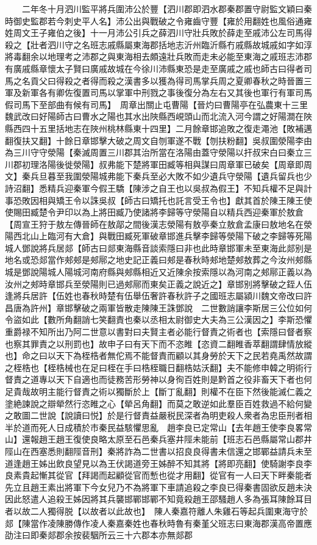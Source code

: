 　　二年冬十月泗川監平將兵圍沛公於豐【泗川郡即泗水郡秦郡置守尉監文穎曰秦時御史監郡若今刺史平人名】沛公出與戰破之令雍齒守豐【雍於用翻姓也風俗通雍姓周文王子雍伯之後】十一月沛公引兵之薛泗川守壯兵敗於薛走至戚沛公左司馬得殺之【壯者泗川守之名班志戚縣屬東海郡括地志沂州臨沂縣冇戚縣故城戚如字如淳將毒翻余以地理考之沛郡之與東海相去頗遠壯兵敗而走未必能至東海之戚班志沛郡有廣戚縣章懷太子賢曰廣戚故城在今徐川沛縣東恐是走至廣戚之戚也師古曰得者司馬之名貢父曰得殺之者得而殺之漢書多以獲為得司馬掌兵周之夏卿春秋之時晉置三軍及新軍各有卿佐復置司馬以掌軍中刑戮之事後復分為左右又其後也軍行有軍司馬假司馬下至部曲有候有司馬】　周章出關止屯曹陽【晉灼曰曹陽亭在弘農東十三里魏武改曰好陽師古曰曹水之陽也其水出陜縣西峴頭山而北流入河今謂之好陽澗在陜縣西四十五里括地志在陜州桃林縣東十四里】二月餘章邯追敗之復走澠池【敗補邁翻復扶又翻】十餘日章邯擊大破之周文自刎軍遂不戰【刎扶粉翻】吳叔圍滎陽李由為三川守守滎陽【秦滅周置三川郡其治所當在洛陽由蓋守滎陽以扞叔宋白曰秦立三川郡初理洛陽後徙滎陽】叔弗能下楚將軍田臧等相與謀曰周章軍已破矣【周章即周文】秦兵旦暮至我圍滎陽城弗能下秦兵至必大敗不如少遺兵守滎陽【遺兵留兵也少詩沼翻】悉精兵迎秦軍今假王驕【陳涉之自王也以吳叔為假王】不知兵權不足與計事恐敗因相與矯王令以誅吳叔【師古曰矯托也託言受王令也】獻其首於陳王陳王使使賜田臧楚令尹印以為上將田臧乃使諸將李歸等守滎陽自以精兵西迎秦軍於敖倉【周宣王狩于敖左傳晉師在敖鄗之間後漢志滎陽有敖亭秦立敖倉孟康曰敖地名在滎陽西北山上臨河有大倉】與戰田臧死軍破章邯進兵擊李歸等滎陽下破之李歸等死陽城人鄧說將兵居郯【師古曰郯東海縣音談索隱曰非也此時章邯軍未至東海此郯别是地名或恐郯當作郟郟是郟鄏之地史記正義曰郟是春秋時郟地楚郟敖葬之今汝州郟縣城是鄧說陽城人陽城河南府縣與郟縣相近又近陳余按索隱以為河南之郟鄏正義以為汝州之郟時章邯兵至滎陽則已過郟鄏而東矣正義之說近之】章邯别將擊破之銍人伍逢將兵居許【伍姓也春秋時楚有伍舉伍奢許春秋許子之國班志屬潁川魏文帝改曰許昌唐為許州】章邯擊破之兩軍皆散走陳陳王誅鄧說　二世數誚讓李斯居三公位如何令盜如此【數所角翻誚七笑翻責也秦以丞相太尉御史大夫為三公漢因之】李斯恐懼重爵禄不知所出乃阿二世意以書對曰夫賢主者必能行督責之術者也【索隱曰督者察也察其罪責之以刑罰也】故申子曰有天下而不恣睢【恣資二翻睢香萃翻謂肆情放縱也】命之曰以天下為桎梏者無佗焉不能督責而顧以其身勞於天下之民若堯禹然故謂之桎梏也【桎梏械也在足曰桎在手曰梏桎職日翻梏姑沃翻】夫不能修申韓之明術行督責之道專以天下自適也而徒務苦形勞神以身徇百姓則是黔首之役非畜天下者也何足貴哉故明主能行督責之術以獨斷於上【斷丁亂翻】則權不在臣下然後能滅仁義之塗絶諫說之辯犖然行恣睢之心【犖呂角翻】而莫之敢逆如此羣臣百姓救過不給何變之敢圖二世說【說讀曰悦】於是行督責益嚴税民深者為明吏殺人衆者為忠臣刑者相半於道而死人日成積於市秦民益駭懼思亂　趙李良已定常山【去年趙王使李良畧常山】還報趙王趙王復使良略太原至石邑秦兵塞井陘未能前【班志石邑縣屬常山郡井陘山在西塞悉則翻陘音刑】秦將詐為二世書以招良良得書未信還之邯鄲益請兵未至道逢趙王姊出飲良望見以為王伏謁道旁王姊醉不知其將【將即亮翻】使騎謝李良李良素貴起慚其從官【拜謁而起顧從官而慙也從才用翻】從官有一人曰天下畔秦能者先立且趙王素出將軍下今女兒乃不為將軍下車請追殺之李良已得秦書固欲反趙未決因此怒遣人追殺王姊因將其兵襲邯鄲邯鄲不知竟殺趙王邵騷趙人多為張耳陳餘耳目者以故二人獨得脱【以故者以此故也】　陳人秦嘉符離人朱雞石等起兵圍東海守於郯【陳當作凌陳勝傳作凌人秦嘉秦姓也春秋時魯有秦堇父班志曰東海郡漢高帝置應劭注曰即秦郯郡余按裴駰所云三十六郡本亦無郯郡